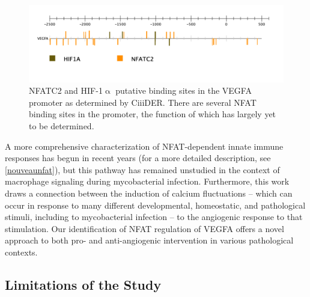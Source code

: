 \begin{figure}
\centering
\includegraphics[width=\textwidth]{images/vegfapromoter.pdf}
\caption[Putative NFATC2 and HIF\hyp{}1$\upalpha$ Binding Sites in the VEGFA promoter]{NFATC2 and HIF\hyp{}1$\upalpha$ putative binding sites in the VEGFA promoter as determined by CiiiDER. There are several NFAT binding sites in the promoter, the function of which has largely yet to be determined.}
\label{figure:promoter}
\end{figure}

A more comprehensive characterization of NFAT\hyp{}dependent innate immune responses has begun in recent years \citep{Deerhake2021, Peuker2022, Poli2022} (for a more detailed description, see \autoref{nouveaunfat}), but this pathway has remained unstudied in the context of macrophage signaling during mycobacterial infection. Furthermore, this work draws a connection between the induction of calcium fluctuations -- which can occur in response to many different developmental, homeostatic, and pathological stimuli, including to mycobacterial infection \citep{Malik2000, Kusner2001, Jayachandran2007, Jayachandran2008, Matty2019} -- to the angiogenic response to that stimulation. Our identification of NFAT regulation of VEGFA offers a novel approach to both pro\hyp{} and anti\hyp{}angiogenic intervention in various pathological contexts.

\subsection{Limitations of the Study}

